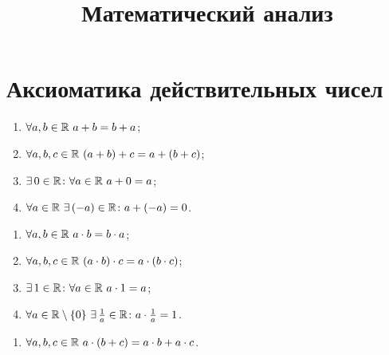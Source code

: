 \documentclass[12pt]{article}
\title{\textbf{Математический анализ}}\date{}\author{}
\begin{document}
\maketitle
\tableofcontents
\label{toc}
\newpage

\section{Аксиоматика действительных чисел}

\begin{axiom}
	\hfill
	\begin{center}
		\begin{minipage}{0.4\textwidth}
			\begin{enumerate}[itemsep=0pt]
				\item $\forall a, b\in \R\ a+b=b+a$;
				\item $\forall a, b, c \in \R\ (a+b)+c=a+(b+c)$;
				\item $\exists\,0\in\R\colon \forall a\in \R\ a+0=a$;
				\item $\forall a\in \R\ \exists\,(-a)\in\R\colon a+(-a)=0$.
			\end{enumerate}
		\end{minipage}
	\end{center}
\end{axiom}
\begin{axiom}
	\hfill
	\begin{center}
		\begin{minipage}{0.4\textwidth}
			\begin{enumerate}[itemsep=0pt, start=5]
				\item $\forall a, b\in \mathbb{R}\ a\cdot b=b\cdot a$;
				\item $\forall a, b, c \in \mathbb{R}\ (a\cdot b)\cdot c=a\cdot(b\cdot c)$;
				\item $\exists\,1\in\R\colon \forall a\in \R\ a\cdot 1=a$;
				\item $\forall a\in
					\mathbb{R}\setminus\{0\}\ \exists\,\frac{1}{a}\in\mathbb{R}\colon a\cdot\frac{1}{a}=1$.
			\end{enumerate}
		\end{minipage}
	\end{center}
\end{axiom}
\begin{axiom}
	\hfill
	\begin{center}
		\begin{minipage}{0.4\textwidth}
			\begin{enumerate}[itemsep=0pt, start=9]
				\item $\forall a, b, c \in \mathbb{R}\ a\cdot (b+c)=a\cdot b+a\cdot c$.
			\end{enumerate}
		\end{minipage}
	\end{center}
\end{axiom}
\end{document}
